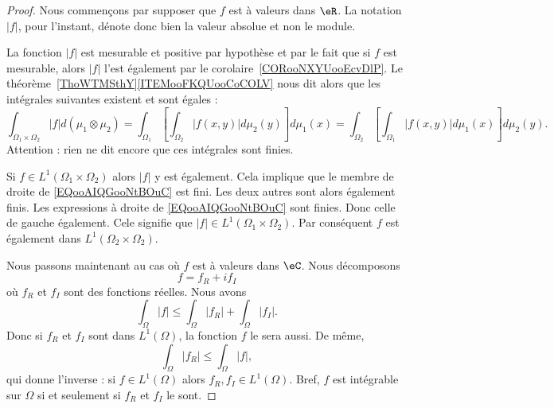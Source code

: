 \begin{proof}

	Nous commençons par supposer que \( f\) est à valeurs dans \( \eR\). La notation \( | f |\), pour l'instant,  dénote donc bien la valeur absolue et non le module.

	La fonction \( | f |\) est mesurable et positive par hypothèse et par le fait que si \( f\) est mesurable, alors \( | f |\) l'est également par le corolaire~\ref{CORooNXYUooEcvDlP}. Le théorème~\ref{ThoWTMSthY}\ref{ITEMooFKQUooCoCOLV} nous dit alors que les intégrales suivantes existent et sont égales :
	\begin{equation}        \label{EQooAIQGooNtBOuC}
		\int_{\Omega_1\times \Omega_2}| f |d(\mu_1\otimes \mu_2)=\int_{\Omega_1}\left[ \int_{\Omega_2}|f(x,y)|d\mu_2(y) \right]d\mu_1(x)
		=\int_{\Omega_2}\left[ \int_{\Omega_1}|f(x,y)|d\mu_1(x) \right]d\mu_2(y).
	\end{equation}
	Attention : rien ne dit encore que ces intégrales sont finies.

	\begin{subproof}
		Si \( f\in L^1(\Omega_1\times \Omega_2)\) alors \( | f |\) y est également. Cela implique que le membre de droite de \eqref{EQooAIQGooNtBOuC} est fini. Les deux autres sont alors également finis.
		Les expressions à droite de \eqref{EQooAIQGooNtBOuC} sont finies. Donc celle de gauche également. Cele signifie que \( | f |\in L^1(\Omega_1\times \Omega_2)\). Par conséquent \( f\) est également dans \(L^1(\Omega_2\times \Omega_2) \).
	\end{subproof}

	Nous passons maintenant au cas où \( f\) est à valeurs dans \( \eC\). Nous décomposons
	\begin{equation}
		f=f_R+if_I
	\end{equation}
	où \( f_R\) et \( f_I\) sont des fonctions réelles. Nous avons
	\begin{equation}        \label{EQooZEOAooIMwKwk}
		\int_{\Omega}| f |\leq \int_{\Omega}| f_R |+\int_{\Omega}| f_I |.
	\end{equation}
	Donc si \( f_R\) et \( f_I\) sont dans \( L^1(\Omega)\), la fonction \( f\) le sera aussi. De même,
	\begin{equation}
		\int_{\Omega}| f_R |\leq \int_{\Omega}| f |,
	\end{equation}
	qui donne l'inverse : si \( f\in L^1(\Omega)\) alors \( f_R,f_I\in L^1(\Omega)\). Bref, \( f\) est intégrable sur \( \Omega\) si et seulement si \( f_R\) et \( f_I\) le sont.


\end{proof}
